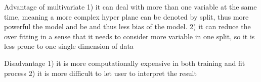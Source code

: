 \begin{answer}

Advantage of multivariate 1) it can deal with more than one variable at the same time, meaning a more complex hyper plane can be denoted by split, thus more powerful the model and be and thus less bias of the model. 2) it can reduce the over fitting in a sense that it needs to consider more variable in one split, so it is less prone to one single dimension of data

Disadvantage 1) it is more computationally expensive in both training and fit process 2) it is more difficult to let user to interpret the result 
\end{answer}